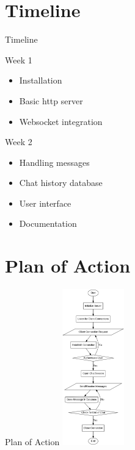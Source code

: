 \documentclass{beamer}
\begin{document}
\section{Timeline}
\begin{frame}{Timeline}
    \begin{block}{Week 1}
        \begin{itemize}
            \item Installation
            \item Basic http server
            \item Websocket integration
        \end{itemize}
    \end{block}
    
    \begin{block}{Week 2}
        \begin{itemize}
            \item Handling messages
            \item Chat history database
            \item User interface
            \item Documentation
        \end{itemize}
    \end{block}
\end{frame}

\section{Plan of Action}
\begin{frame}{Plan of Action}
    \centering
    \includegraphics[width=0.2\textwidth]{Graphviz files/Images/graph.png}
\end{frame}
\end{document}
